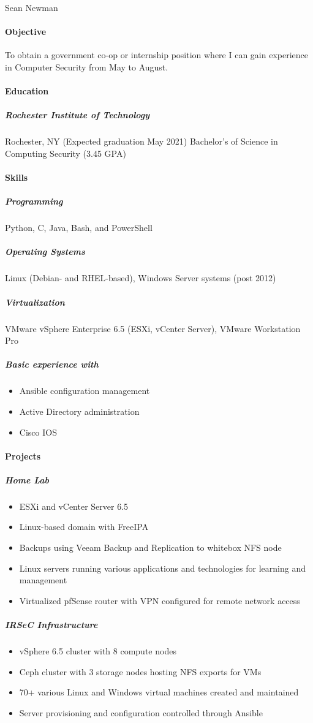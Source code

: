\documentclass{article}
\begin{document}
Sean Newman


\paragraph{Objective}
To obtain a government co-op or internship position where I can gain experience in Computer Security from May to August.

\paragraph{Education}
\subparagraph{Rochester Institute of Technology}
Rochester, NY (Expected graduation May 2021)
Bachelor's of Science in Computing Security (3.45 GPA)

\paragraph{Skills}
\subparagraph{Programming}Python, C, Java, Bash, and PowerShell
\subparagraph{Operating Systems}Linux (Debian- and RHEL-based), Windows Server systems (post 2012)
\subparagraph{Virtualization}VMware vSphere Enterprise 6.5 (ESXi, vCenter Server), VMware Workstation Pro
\subparagraph{Basic experience with}
\begin{itemize}
	\item Ansible configuration management
	\item Active Directory administration
	\item Cisco IOS
\end{itemize}

\paragraph{Projects}
\subparagraph{Home Lab}
\begin{itemize}
	\item ESXi and vCenter Server 6.5
	\item Linux-based domain with FreeIPA
	\item Backups using Veeam Backup and Replication to whitebox NFS node
	\item Linux servers running various applications and technologies for learning and management
	\item Virtualized pfSense router with VPN configured for remote network access
\end{itemize}
\subparagraph{IRSeC Infrastructure}
\begin{itemize}
	\item vSphere 6.5 cluster with 8 compute nodes
	\item Ceph cluster with 3 storage nodes hosting NFS exports for VMs
	\item 70+ various Linux and Windows virtual machines created and maintained
	\item Server provisioning and configuration controlled through Ansible
\end{itemize}
\end{document}
